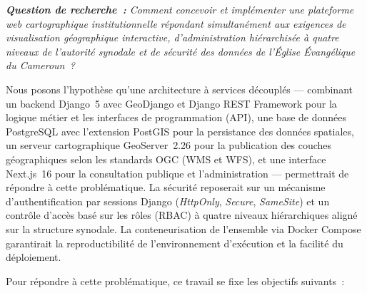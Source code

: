 \documentclass[12pt, a4paper]{report}
\begin{document}
\vspace{6pt}
\noindent\colorbox{eeclightgreen!80}{\parbox{0.88\linewidth}{%
  \vspace{6pt}%
  \noindent\textit{\textbf{Question de recherche~:} Comment concevoir et
  implémenter une plateforme web cartographique institutionnelle répondant
  simultanément aux exigences de visualisation géographique interactive,
  d'administration hiérarchisée à quatre niveaux de l'autorité synodale et de
  sécurité des données de l'Église Évangélique du Cameroun~?}%
  \vspace{6pt}%
}}
\vspace{6pt}

Nous posons l'hypothèse qu'une architecture à services découplés --- combinant un
backend Django~5 avec GeoDjango et Django REST Framework pour la logique métier et
les interfaces de programmation (API), une base de données PostgreSQL avec
l'extension PostGIS pour la persistance des données spatiales, un serveur
cartographique GeoServer~2.26 pour la publication des couches géographiques selon
les standards OGC (WMS et WFS), et une interface Next.js~16 pour la consultation
publique et l'administration --- permettrait de répondre à cette problématique. La
sécurité reposerait sur un mécanisme d'authentification par sessions Django
(\textit{HttpOnly}, \textit{Secure}, \textit{SameSite}) et un contrôle d'accès
basé sur les rôles (RBAC) à quatre niveaux hiérarchiques aligné sur la structure
synodale. La conteneurisation de l'ensemble via Docker Compose garantirait la
reproductibilité de l'environnement d'exécution et la facilité du déploiement.

\medskip

Pour répondre à cette problématique, ce travail se fixe les objectifs suivants~:
\end{document}
